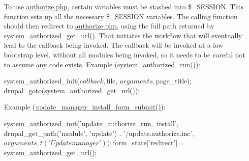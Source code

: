 To use \hyperlink{authorize_8php}{authorize.php}, certain variables must be stashed into \$\_\-SESSION. This function sets up all the necessary \$\_\-SESSION variables. The calling function should then redirect to \hyperlink{authorize_8php}{authorize.php}, using the full path returned by \hyperlink{group__authorize_gab59393fbd369097724650dec4be9c1dd}{system\_\-authorized\_\-get\_\-url()}. That initiates the workflow that will eventually lead to the callback being invoked. The callback will be invoked at a low bootstrap level, without all modules being invoked, so it needs to be careful not to assume any code exists. Example (\hyperlink{group__authorize_gae12fb581acdf9ef042c9137fc6de4d4c}{system\_\-authorized\_\-run()}): 
\begin{DoxyCode}
   system_authorized_init($callback, $file, $arguments, $page_title);
   drupal_goto(system_authorized_get_url());
\end{DoxyCode}
 Example (\hyperlink{group__update__manager__install_ga52e9f2cddddddccf921284b01f9505b0}{update\_\-manager\_\-install\_\-form\_\-submit()}): 
\begin{DoxyCode}
  system_authorized_init('update_authorize_run_install',
    drupal_get_path('module', 'update') . '/update.authorize.inc',
    $arguments, t('Update manager'));
  $form_state['redirect'] = system_authorized_get_url();
\end{DoxyCode}



